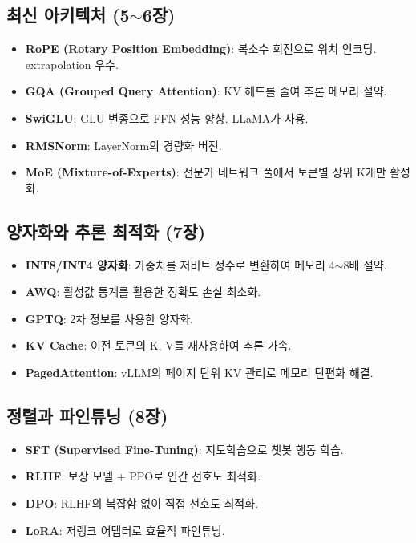 \subsection{최신 아키텍처 (5$\sim$6장)}

\begin{itemize}
  \item \textbf{RoPE (Rotary Position Embedding)}: 복소수 회전으로 위치 인코딩. extrapolation 우수.
  \item \textbf{GQA (Grouped Query Attention)}: KV 헤드를 줄여 추론 메모리 절약.
  \item \textbf{SwiGLU}: GLU 변종으로 FFN 성능 향상. LLaMA가 사용.
  \item \textbf{RMSNorm}: LayerNorm의 경량화 버전.
  \item \textbf{MoE (Mixture-of-Experts)}: 전문가 네트워크 풀에서 토큰별 상위 K개만 활성화.
\end{itemize}

\subsection{양자화와 추론 최적화 (7장)}

\begin{itemize}
  \item \textbf{INT8/INT4 양자화}: 가중치를 저비트 정수로 변환하여 메모리 4$\sim$8배 절약.
  \item \textbf{AWQ}: 활성값 통계를 활용한 정확도 손실 최소화.
  \item \textbf{GPTQ}: 2차 정보를 사용한 양자화.
  \item \textbf{KV Cache}: 이전 토큰의 K, V를 재사용하여 추론 가속.
  \item \textbf{PagedAttention}: vLLM의 페이지 단위 KV 관리로 메모리 단편화 해결.
\end{itemize}

\subsection{정렬과 파인튜닝 (8장)}

\begin{itemize}
  \item \textbf{SFT (Supervised Fine-Tuning)}: 지도학습으로 챗봇 행동 학습.
  \item \textbf{RLHF}: 보상 모델 + PPO로 인간 선호도 최적화.
  \item \textbf{DPO}: RLHF의 복잡함 없이 직접 선호도 최적화.
  \item \textbf{LoRA}: 저랭크 어댑터로 효율적 파인튜닝.
\end{itemize}

